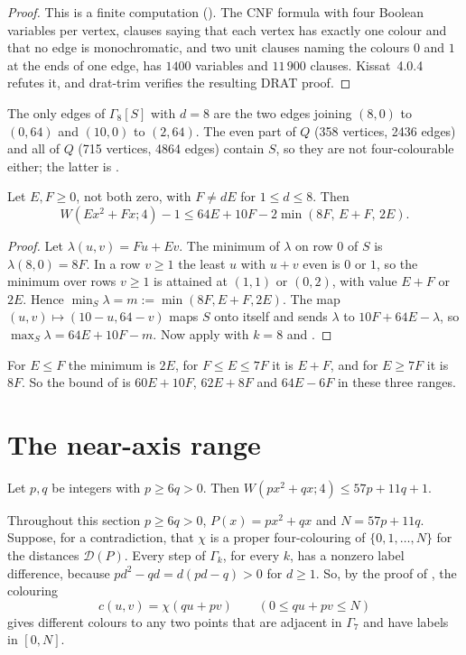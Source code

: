 \documentclass[11pt,colorlinks]{charlie}
\newcommand{\D}{\mathcal D}
\begin{document}
\begin{proof}
This is a finite computation (). The CNF formula with four Boolean variables per vertex, clauses saying that each vertex has exactly one colour and that no edge is monochromatic, and two unit clauses naming the colours $0$ and $1$ at the ends of one edge, has $1400$ variables and $11\,900$ clauses. Kissat~4.0.4 \cite{Kissat} refutes it, and drat-trim \cite{DRAT} verifies the resulting DRAT proof.
\end{proof}

The only edges of $\Gamma_8[S]$ with $d=8$ are the two edges joining $(8,0)$ to $(0,64)$ and $(10,0)$ to $(2,64)$. The even part of $Q$ (358 vertices, 2436 edges) and all of $Q$ (715 vertices, 4864 edges) contain $S$, so they are not four-colourable either; the latter is \cite[Lemma~4.1]{KGRW}.

\begin{corollary}\label{cor:crop}
Let $E,F\ge0$, not both zero, with $F\ne dE$ for $1\le d\le8$. Then
\[
W(Ex^2+Fx;4)-1\le64E+10F-2\min(8F,\,E+F,\,2E).
\]
\end{corollary}

\begin{proof}
Let $\lambda(u,v)=Fu+Ev$. The minimum of $\lambda$ on row $0$ of $S$ is $\lambda(8,0)=8F$. In a row $v\ge1$ the least $u$ with $u+v$ even is $0$ or $1$, so the minimum over rows $v\ge1$ is attained at $(1,1)$ or $(0,2)$, with value $E+F$ or $2E$. Hence $\min_S\lambda=m:=\min(8F,E+F,2E)$. The map $(u,v)\mapsto(10-u,64-v)$ maps $S$ onto itself and sends $\lambda$ to $10F+64E-\lambda$, so $\max_S\lambda=64E+10F-m$. Now apply  with $k=8$ and .
\end{proof}

For $E\le F$ the minimum is $2E$, for $F\le E\le7F$ it is $E+F$, and for $E\ge7F$ it is $8F$. So the bound of  is $60E+10F$, $62E+8F$ and $64E-6F$ in these three ranges.

\section{The near-axis range}\label{sec:nearaxis}

\begin{theorem}\label{thm:nearaxis}
Let $p,q$ be integers with $p\ge6q>0$. Then $W(px^2+qx;4)\le57p+11q+1$.
\end{theorem}

Throughout this section $p\ge6q>0$, $P(x)=px^2+qx$ and $N=57p+11q$. Suppose, for a contradiction, that $\chi$ is a proper four-colouring of $\{0,1,\dots,N\}$ for the distances $\D(P)$. Every step of $\Gamma_k$, for every $k$, has a nonzero label difference, because $pd^2-qd=d(pd-q)>0$ for $d\ge1$. So, by the proof of , the colouring
\[
c(u,v)=\chi(qu+pv)\qquad(0\le qu+pv\le N)
\]
gives different colours to any two points that are adjacent in $\Gamma_7$ and have labels in $[0,N]$.
\end{document}
